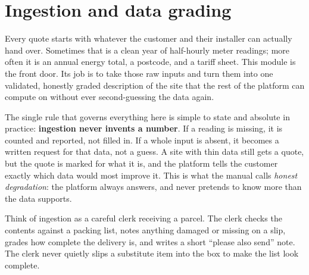 \chapter{Ingestion and data grading}
\label{ch:ingestion}

Every quote starts with whatever the customer and their installer can actually hand over. Sometimes that is a clean year of half-hourly meter readings; more often it is an annual energy total, a postcode, and a tariff sheet. This module is the front door. Its job is to take those raw inputs and turn them into one validated, honestly graded description of the site that the rest of the platform can compute on without ever second-guessing the data again.

The single rule that governs everything here is simple to state and absolute in practice: \textbf{ingestion never invents a number}. If a reading is missing, it is counted and reported, not filled in. If a whole input is absent, it becomes a written request for that data, not a guess. A site with thin data still gets a quote, but the quote is marked for what it is, and the platform tells the customer exactly which data would most improve it. This is what the manual calls \emph{honest degradation}: the platform always answers, and never pretends to know more than the data supports.

\begin{plainnote}
Think of ingestion as a careful clerk receiving a parcel. The clerk checks the contents against a packing list, notes anything damaged or missing on a slip, grades how complete the delivery is, and writes a short ``please also send'' note. The clerk never quietly slips a substitute item into the box to make the list look complete.
\end{plainnote}


